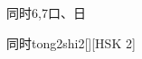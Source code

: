 \begin{entry}{同时}{6,7}{⼝、⽇}
  \begin{phonetics}{同时}{tong2shi2}[][HSK 2]
  \end{phonetics}
\end{entry}
